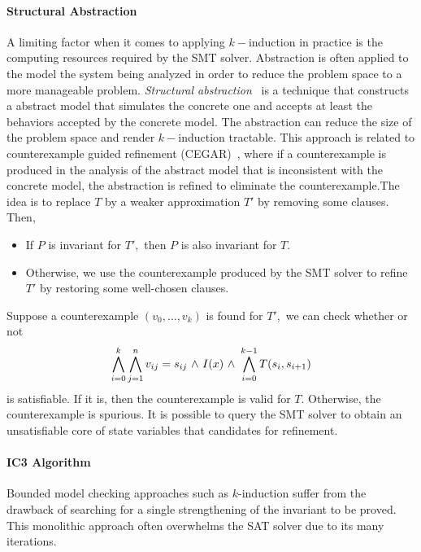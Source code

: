 \paragraph{Structural Abstraction}
A limiting factor when it comes to applying $k-$induction in practice
is the computing resources required by the SMT solver. Abstraction is
often applied to the model the system being analyzed in order to
reduce the problem space to a more manageable problem.  {\em
  Structural abstraction}~\cite{ bh07structural} is a technique that
constructs a abstract model that simulates the concrete one and
accepts at least the behaviors accepted by the concrete model. The
abstraction can reduce the size of the problem
space and render $k-$induction tractable. This
approach is  
related to counterexample guided refinement
(CEGAR)~\cite{Clarke2003CAR}, where if a counterexample is produced in
the analysis of the abstract model that is inconsistent with the
concrete model, the abstraction is refined to eliminate the
counterexample.The idea is to replace $T$
by a weaker approximation $T'$ by removing some clauses. Then, 
\begin{itemize}
\item If $P$ is invariant for $T',$ then $P$ is also invariant for $T.$
\item Otherwise, we use the counterexample produced by the SMT solver
  to refine $T'$ by restoring some well-chosen clauses.
\end{itemize}  
Suppose a counterexample $(v_0,\ldots, v_k)$ is found for $T',$ we can
check  whether or not
$$\bigwedge_{i=0}^k  \bigwedge_{j=1}^n v_{ij} = s_{ij} {\ \wedge \ } I(x)
{\ \wedge \ } \bigwedge_{i=0}^{k-1} T(s_i,s_{i+1})$$ 
is satisfiable.  If it is, then the counterexample is valid for $T.$
Otherwise, the counterexample is spurious.   It is possible to query
the SMT solver to obtain an unsatisfiable core of state variables that
candidates for refinement.


\paragraph{IC3 Algorithm} 

Bounded model checking approaches such as $k$-induction suffer from
the drawback of searching for a single strengthening of the invariant
to be proved. This monolithic approach often  overwhelms the SAT
solver due to its many iterations.  

